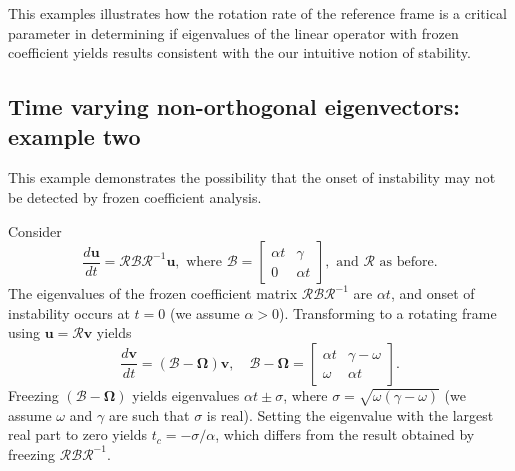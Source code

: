 \documentclass[letterpaper,10pt]{article}
\newcommand{\bu}{\boldsymbol{u}}
\newcommand{\bv}{\boldsymbol{v}}
\newcommand{\cB}{\boldsymbol{\mathcal{B}}}
\newcommand{\cR}{\boldsymbol{\mathcal{R}}}
\newcommand{\cOmega}{\boldsymbol{\boldsymbol{\Omega}}}
\newcommand{\Btmat}{{
\begin{bmatrix} 
 \alpha t & \gamma \\
 0  & \alpha t
\end{bmatrix}
}}
\begin{document}
This examples illustrates how the rotation rate of the reference frame is a critical parameter in determining if eigenvalues of the linear operator with frozen coefficient yields results consistent with the our intuitive notion of stability.

\subsection*{Time varying non-orthogonal eigenvectors: example two}
This example demonstrates the possibility that the onset of instability may not be detected by frozen coefficient analysis.

Consider 
\begin{equation}
 \frac{d\bu}{dt} = \cR \cB \cR^{-1} \bu, \text{ where } \cB = \Btmat, \text{ and } \cR \text { as before.}
\end{equation}
The eigenvalues of the frozen coefficient matrix $\cR \cB \cR^{-1}$ are $\alpha t$, and onset of instability occurs at $t=0$ (we assume $\alpha>0$). Transforming to a rotating frame using $\bu = \cR \bv$ yields
\begin{equation}
 \frac{d\bv}{dt} = (\cB - \cOmega) \bv, \quad \cB - \cOmega = \begin{bmatrix} \alpha t & \gamma-\omega \\ \omega & \alpha t \end{bmatrix}.
\end{equation}
Freezing $(\cB - \cOmega)$ yields eigenvalues $\alpha t \pm \sigma$, where $\sigma = \sqrt{\omega (\gamma-\omega)}$ (we assume $\omega$ and $\gamma$ are such that $\sigma$ is real). Setting the eigenvalue with the largest real part to zero yields $t_c = -\sigma/\alpha$, which differs from the result obtained by freezing $\cR \cB \cR^{-1}$. 
\end{document}
